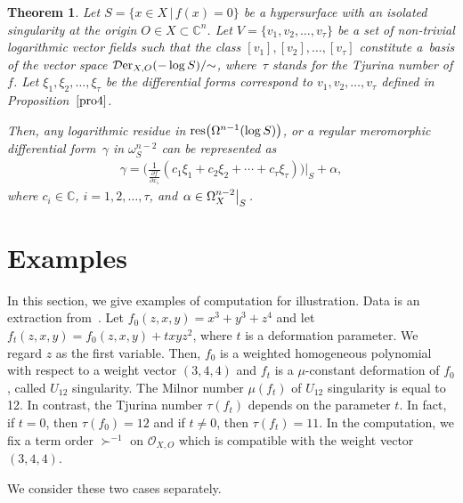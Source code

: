 \documentclass[pdftex]{sigma}%
\numberwithin{equation}{section}
\newtheorem{Theorem}{Theorem}[section]
\begin{document}
\begin{Theorem}\label{Th6}
Let $S=\{ x \in X \,|\, f(x)=0\} $ be a hypersurface with an isolated singularity at the origin $ O \in X \subset {\mathbb C}^n$. Let $V=\{v_1, v_2,\ldots, v_{\tau}\} $ be a set of non-trivial logarithmic vector fields such that the class $[v_1], [v_2], \dots, [v_{\tau}]$ constitute a~basis of the vector space ${\mathcal D}{\rm er}_{X,O}(-\log S)/{\sim}$, where~$\tau$ stands for the Tjurina number of $f$. Let $\xi_1, \xi_2, \ldots, \xi_{\tau}$ be the differential forms correspond to
$v_1, v_2, \ldots, v_{\tau}$ defined in Proposition~$\ref{pro4}$.

Then, any logarithmic residue in ${\rm res}\big(\Omega^{n-1}(\log S)\big)$, or a regular meromorphic differential form~$\gamma$ in $\omega_S^{n-2}$ can be represented as
\begin{gather*}
\gamma = \bigg(\frac{1}{\frac{\partial f}{\partial x_1}}(c_1\xi_1+c_2\xi_2+ \cdots +c_{\tau}\xi_{\tau})\bigg)\bigg|_S + \alpha,
\end{gather*}
where $c_i \in {\mathbb C}$, $i=1,2,\dots, \tau$, and $ \left. \alpha \in \Omega_X^{n-2}\middle|\raisebox{-0.7ex}[1ex][-2ex]{{\hspace{-1mm}\;$_S$}}\right. $.
\end{Theorem}

\section{Examples}\label{sec4}

In this section, we give examples of computation for illustration. Data is an extraction from~\cite{TN20}. Let $f_0(z,x,y)=x^3+y^3+z^4 $ and let $ f_t(z,x,y)=f_0(z,x,y)+txyz^2$,
where $t$ is a deformation parameter. We regard $z$ as the first variable. Then, $f_0$ is a weighted homogeneous polynomial with respect to a weight vector $(3,4,4)$ and $f_t$ is a $\mu$-constant deformation of $f_0$, called $U_{12}$ singularity. The Milnor number
$\mu(f_t)$ of $U_{12}$ singularity is equal to 12. In contrast, the Tjurina number
$\tau(f_t)$ depends on the parameter $t$. In fact, if $t=0$, then $\tau(f_0) = 12$ and if $t \ne 0$, then $\tau(f_t) =11$. In the computation, we fix a term order $\succ^{-1}$ on ${\mathcal O}_{X,O}$ which is compatible with the weight vector $(3,4,4)$.

We consider these two cases separately.
\end{document}
